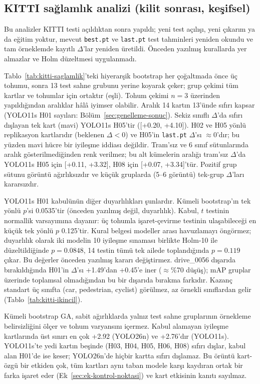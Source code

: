 \FloatBarrier
\subsection{KITTI sağlamlık analizi (kilit sonrası, keşifsel)}\label{sec:ek-saglamlik}
Bu analizler KITTI testi açıldıktan sonra yapıldı; yeni test açılışı, yeni çıkarım ya da eğitim yoktur, mevcut \texttt{best.pt} ve \texttt{last.pt} test tahminleri yeniden okundu ve tam örneklemde kayıtlı $\Delta$'lar yeniden üretildi. Önceden yazılmış kurallarda yer almazlar ve Holm düzeltmesi uygulanmadı.



Tablo~\ref{tab:kitti-saglamlik}'teki hiyerarşik bootstrap her çoğaltmada önce üç tohumu, sonra 13 test sahne grubunu yerine koyarak çeker; grup çekimi tüm kartlar ve tohumlar için ortaktır (eşli). Tohum çekimi $n=3$ üzerinden yapıldığından aralıklar hâlâ iyimser olabilir. Aralık 14 kartın 13'ünde sıfırı kapsar (YOLO11s H01 sayıları: Bölüm~\ref{sec:genelleme-sonuc}). Sekiz sınıflı $\Delta$'da sıfırı dışlayan tek kart (mavi) YOLO11s H05'tir ([+0.20, +4.10]). H02 ve H05 yönlü replikasyon kartlarıdır (beklenen $\Delta<0$) ve H05'in \texttt{last.pt} $\Delta$'sı $\approx$0'dır; bu yüzden mavi hücre bir iyileşme iddiası değildir. Tram'sız ve 6 sınıf sütunlarında aralık gösterilmediğinden renk verilmez; bu alt kümelerin aralığı tram'sız $\Delta$'da YOLO11s H05 için [+0.11, +3.32], H08 için [+0.07, +3.34]'tür. Pozitif grup sütunu görüntü ağırlıksızdır ve küçük gruplarda (5--6 görüntü) tek-grup $\Delta$'ları kararsızdır.

YOLO11s H01 kabulünün diğer duyarlılıkları şunlardır. Kümeli bootstrap'ın tek yönlü $p$'si 0.0535'tir (önceden yazılmış değil, duyarlılık). Kabul, $t$ testinin normallik varsayımına dayanır: üç tohumla işaret-çevirme testinin ulaşabileceği en küçük tek yönlü $p$ 0.125'tir. Kural belgesi modeller arası havuzlamayı öngörmez; duyarlılık olarak iki modelin 10 iyileşme sınaması birlikte Holm-10 ile düzeltildiğinde $p=0.0848$, 14 testin tümü tek ailede toplandığında $p=0.119$ çıkar. Bu değerler önceden yazılmış kararı değiştirmez. drive\_0056 dışarıda bırakıldığında H01'in $\Delta$'sı +1.49'dan +0.45'e iner ($\approx$\%70 düşüş); mAP gruplar üzerinde toplamsal olmadığından bu bir dışarıda bırakma farkıdır. Kazanç standart üç sınıfta (car, pedestrian, cyclist) görülmez, az örnekli sınıflardan gelir (Tablo~\ref{tab:kitti-ikincil}).

Kümeli bootstrap GA, sabit ağırlıklarda yalnız test sahne gruplarının örnekleme belirsizliğini ölçer ve tohum varyansını içermez. Kabul alamayan iyileşme kartlarında üst sınırı en çok +2.92 (YOLO26n) ve +2.76'dır (YOLO11s). YOLO11s'te yedi kartın beşinde (H03, H04, H05, H06, H08) sıfırı dışlar, kabul alan H01'de ise keser; YOLO26n'de hiçbir kartta sıfırı dışlamaz. Bu örüntü kart-özgü bir etkiden çok, tüm kartları aynı taban modele karşı kaydıran ortak bir farka işaret eder (Ek~\ref{sec:ek-kontrol-noktasi}) ve kart etkisinin kanıtı sayılmaz.

